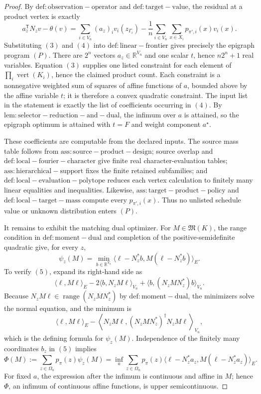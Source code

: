 \documentclass{article}
\begin{document}
\begin{proof}
By \(\mathrm{def:observation-operator}\) and \(\mathrm{def:target-value}\), the residual at a product vertex is exactly
\[
a_z^{\mathsf T}N_zv-\theta(v)
=\sum_{i\in V_n}(a_z)_iv_i(z_{\Gamma_i})
-\frac1n\sum_{i\in V_n}\sum_{x\in X_i}p_{\pi',i}(x)v_i(x).
\tag{4}
\]
Substituting \((3)\) and \((4)\) into \(\mathrm{def:linear-frontier}\) gives precisely the epigraph program \((P)\). There are \(2^n\) vectors \(a_z\in\mathbb R^{V_n}\) and one scalar \(t\), hence \(n2^n+1\) real variables. Equation \((3)\) supplies one listed constraint for each element of \(\prod_i\operatorname{vert}(K_i)\), hence the claimed product count. Each constraint is a nonnegative weighted sum of squares of affine functions of \(a\), bounded above by the affine variable \(t\); it is therefore a convex quadratic constraint. The input list in the statement is exactly the list of coefficients occurring in \((4)\). By \(\mathrm{lem:selector-reduction-and-dual}\), the infimum over \(a\) is attained, so the epigraph optimum is attained with \(t=F\) and weight component \(a^{\star}\).

These coefficients are computable from the declared inputs. The source mass table follows from \(\mathrm{ass:source-product-design}\); source overlap and \(\mathrm{def:local-fourier-character}\) give finite real character-evaluation tables; \(\mathrm{ass:hierarchical-support}\) fixes the finite retained subfamilies; and \(\mathrm{def:local-evaluation-polytope}\) reduces each vertex calculation to finitely many linear equalities and inequalities. Likewise, \(\mathrm{ass:target-product-policy}\) and \(\mathrm{def:local-target-mass}\) compute every \(p_{\pi',i}(x)\). Thus no unlisted schedule value or unknown distribution enters \((P)\).

It remains to exhibit the matching dual optimizer. For \(M\in\mathfrak M(K)\), the range condition in \(\mathrm{def:moment-dual}\) and completion of the positive-semidefinite quadratic give, for every \(z\),
\[
\psi_z(M)=\min_{b\in\mathbb R^{V_n}}
\langle\ell-N_z^{\ast}b,M(\ell-N_z^{\ast}b)\rangle_E.
\tag{5}
\]
To verify \((5)\), expand its right-hand side as
\[
\langle\ell,M\ell\rangle_E
-2\langle b,N_zM\ell\rangle_{V_n}
+\langle b,(N_zMN_z^{\ast})b\rangle_{V_n}.
\]
Because \(N_zM\ell\in\operatorname{range}(N_zMN_z^{\ast})\) by \(\mathrm{def:moment-dual}\), the minimizers solve the normal equation, and the minimum is
\[
\langle\ell,M\ell\rangle_E
-\left\langle N_zM\ell,
(N_zMN_z^{\ast})^{\dagger}N_zM\ell\right\rangle_{V_n},
\]
which is the defining formula for \(\psi_z(M)\). Independence of the finitely many coordinates \(b_z\) in \((5)\) implies
\[
\Phi(M):=\sum_{z\in\Omega_n}p_{\pi}(z)\psi_z(M)
=\inf_a\sum_{z\in\Omega_n}p_{\pi}(z)
\langle\ell-N_z^{\ast}a_z,M(\ell-N_z^{\ast}a_z)\rangle_E.
\tag{6}
\]
For fixed \(a\), the expression after the infimum is continuous and affine in \(M\); hence \(\Phi\), an infimum of continuous affine functions, is upper semicontinuous.


\end{proof}
\end{document}

